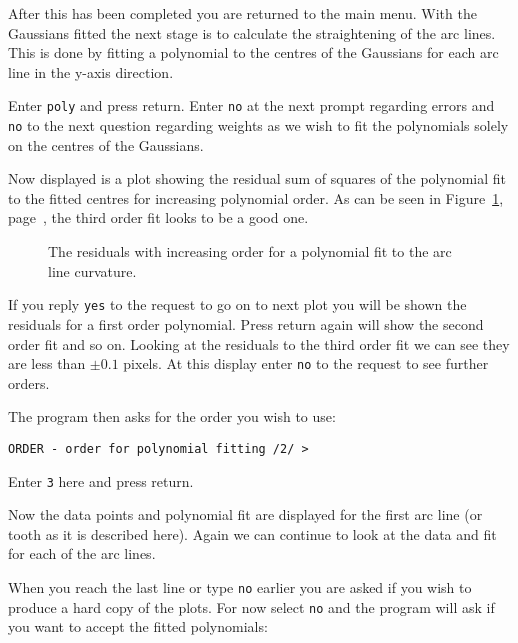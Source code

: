 \documentclass[twoside,11pt]{article}
\newcommand{\scspec}[2]{#1}
\newcommand{\scspec}[2]{#2}
\begin{document}
After this has been completed you are returned to the main menu. With
the Gaussians fitted the next stage is to calculate the straightening
of the arc lines. This is done by fitting a polynomial to the centres
of the Gaussians for each arc line in the y-axis direction.

Enter {\tt poly} and press return. Enter {\tt no} at the next prompt
regarding errors and {\tt no} to the next question regarding weights
as we wish to fit the polynomials solely on the centres of the
Gaussians.

Now displayed is a plot showing the residual sum of squares of the
polynomial fit to the fitted centres for increasing polynomial order.
As can be seen in \scspec{Figure~\ref{poly_order},
page~\pageref{poly_order},}{the figure below} the third order fit
looks to be a good one.

\begin{figure}
\begin{center}
  \scspec{\leavevmode\epsfysize=105mm\epsfbox{sc7_16.eps}}
         {\leavevmode\epsfysize=136mm}

  \parbox{140mm}{
    \caption{The residuals with increasing order for a polynomial fit to 
             the arc line curvature.}
    \label{poly_order}
  }
\end{center}
\end{figure}


If you reply {\tt yes} to the request to go on to next plot you will
be shown the residuals for a first order polynomial. Press return
again will show the second order fit and so on. Looking at the
residuals to the third order fit we can see they are less than
$\pm0.1$ pixels. At this display enter {\tt no} to the request to see
further orders.

The program then asks for the order you wish to use:
{\scspec{\small}{ }
\begin{verbatim}
ORDER - order for polynomial fitting /2/ > 
\end{verbatim}
}

Enter {\tt 3} here and press return.

Now the data points and polynomial fit are displayed for the first arc
line (or tooth as it is described here). Again we can continue to look
at the data and fit for each of the arc lines.

When you reach the last line or type {\tt no} earlier you are asked if
you wish to produce a hard copy of the plots. For now select {\tt no}
and the program will ask if you want to accept the fitted polynomials:
\end{document}
